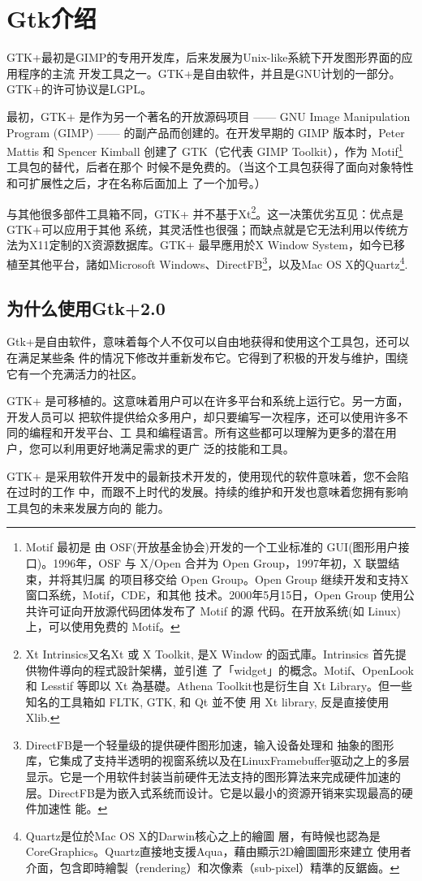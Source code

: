 

\section{Gtk介绍}

GTK+最初是GIMP的专用开发库，后来发展为Unix-like系統下开发图形界面的应用程序的主流
开发工具之一。GTK+是自由软件，并且是GNU计划的一部分。GTK+的许可协议是LGPL。

最初，GTK+ 是作为另一个著名的开放源码项目 —— GNU Image Manipulation Program
(GIMP) —— 的副产品而创建的。在开发早期的 GIMP 版本时，Peter Mattis 和 Spencer
Kimball 创建了 GTK（它代表 GIMP Toolkit），作为 Motif\footnote{Motif 最初是
  由 OSF(开放基金协会)开发的一个工业标准的 GUI(图形用户接
  口)。1996年，OSF 与 X/Open 合并为 Open Group，1997年初，X 联盟结束，并将其归属
  的项目移交给 Open Group。Open Group 继续开发和支持X窗口系统，Motif，CDE，和其他
  技术。2000年5月15日，Open Group 使用公共许可证向开放源代码团体发布了 Motif 的源
  代码。在开放系统(如 Linux)上，可以使用免费的 Motif。} 工具包的替代，后者在那个
时候不是免费的。（当这个工具包获得了面向对象特性和可扩展性之后，才在名称后面加上
了一个加号。）

与其他很多部件工具箱不同，GTK+ 并不基于Xt\footnote{Xt Intrinsics又名Xt 或 X
  Toolkit, 是X Window 的函式庫。Intrinsics 首先提供物件導向的程式設計架構，並引進
  了「widget」的概念。Motif、OpenLook 和 Lesstif 等即以 Xt 為基礎。Athena
  Toolkit也是衍生自 Xt Library。但一些知名的工具箱如 FLTK, GTK, 和 Qt 並不使
  用 Xt library, 反是直接使用 Xlib.}。这一决策优劣互见：优点是GTK+可以应用于其他
系统，其灵活性也很强；而缺点就是它无法利用以传统方法为X11定制的X资源数据库。GTK+
最早應用於X Window System，如今已移植至其他平台，諸如Microsoft
Windows、DirectFB\footnote{DirectFB是一个轻量级的提供硬件图形加速，输入设备处理和
  抽象的图形库，它集成了支持半透明的视窗系统以及在LinuxFramebuffer驱动之上的多层
  显示。它是一个用软件封装当前硬件无法支持的图形算法来完成硬件加速的
  层。DirectFB是为嵌入式系统而设计。它是以最小的资源开销来实现最高的硬件加速性
  能。}，以及Mac OS X的Quartz\footnote{Quartz是位於Mac OS X的Darwin核心之上的繪圖
  層，有時候也認為是CoreGraphics。Quartz直接地支援Aqua，藉由顯示2D繪圖圖形來建立
  使用者介面，包含即時繪製（rendering）和次像素（sub-pixel）精準的反鋸齒。}.

\subsection{为什么使用Gtk+2.0}

Gtk+是自由软件，意味着每个人不仅可以自由地获得和使用这个工具包，还可以在满足某些条
件的情况下修改并重新发布它。它得到了积极的开发与维护，围绕它有一个充满活力的社区。

GTK+ 是可移植的。这意味着用户可以在许多平台和系统上运行它。另一方面，开发人员可以
把软件提供给众多用户，却只要编写一次程序，还可以使用许多不同的编程和开发平台、工
具和编程语言。所有这些都可以理解为更多的潜在用户，您可以利用更好地满足需求的更广
泛的技能和工具。

GTK+ 是采用软件开发中的最新技术开发的，使用现代的软件意味着，您不会陷在过时的工作
中，而跟不上时代的发展。持续的维护和开发也意味着您拥有影响工具包的未来发展方向的
能力。

